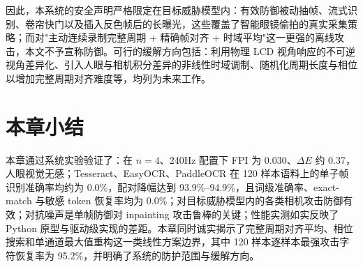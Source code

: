 因此，本系统的安全声明严格限定在目标威胁模型内：有效防御被动抽帧、流式识别、卷帘快门以及插入反色帧后的长曝光，这些覆盖了智能眼镜偷拍的真实采集策略；而对"主动连续录制完整周期 + 精确帧对齐 + 时域平均"这一更强的离线攻击，本文不予宣称防御。可行的缓解方向包括：利用物理 LCD 视角响应的不可逆视角差异化、引入人眼与相机积分差异的非线性时域调制、随机化周期长度与相位以增加完整周期对齐难度等，均列为未来工作。

\section{本章小结}

本章通过系统实验验证了：在 $n=4$、240Hz 配置下 FPI 为 0.030、$\Delta E$ 约 0.37，人眼视觉无感；Tesseract、EasyOCR、PaddleOCR 在 120 样本语料上的单子帧识别准确率均约为 0.0\%，配对降幅达到 93.9\%--94.9\%，且词级准确率、exact-match 与敏感 token 恢复率均为 0.0\%；对目标威胁模型内的各类相机攻击防御有效；对抗噪声是单帧防御对 inpainting 攻击鲁棒的关键；性能实测如实反映了 Python 原型与驱动级实现的差距。本章同时诚实揭示了完整周期对齐平均、相位搜索和单通道最大值重构这一类线性方案边界，其中 120 样本逐样本最强攻击字符恢复率为 95.2\%，并明确了系统的防护范围与缓解方向。
